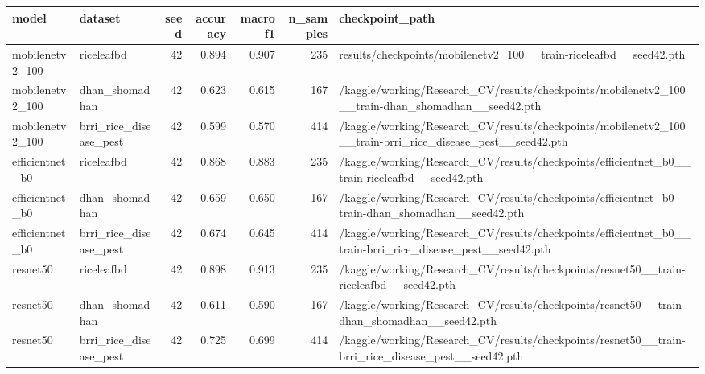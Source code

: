 \begin{tabular}{llrrrrl}
\toprule
model & dataset & seed & accuracy & macro_f1 & n_samples & checkpoint_path \\
\midrule
mobilenetv2_100 & riceleafbd & 42 & 0.894 & 0.907 & 235 & results/checkpoints/mobilenetv2_100__train-riceleafbd__seed42.pth \\
mobilenetv2_100 & dhan_shomadhan & 42 & 0.623 & 0.615 & 167 & /kaggle/working/Research_CV/results/checkpoints/mobilenetv2_100__train-dhan_shomadhan__seed42.pth \\
mobilenetv2_100 & brri_rice_disease_pest & 42 & 0.599 & 0.570 & 414 & /kaggle/working/Research_CV/results/checkpoints/mobilenetv2_100__train-brri_rice_disease_pest__seed42.pth \\
efficientnet_b0 & riceleafbd & 42 & 0.868 & 0.883 & 235 & /kaggle/working/Research_CV/results/checkpoints/efficientnet_b0__train-riceleafbd__seed42.pth \\
efficientnet_b0 & dhan_shomadhan & 42 & 0.659 & 0.650 & 167 & /kaggle/working/Research_CV/results/checkpoints/efficientnet_b0__train-dhan_shomadhan__seed42.pth \\
efficientnet_b0 & brri_rice_disease_pest & 42 & 0.674 & 0.645 & 414 & /kaggle/working/Research_CV/results/checkpoints/efficientnet_b0__train-brri_rice_disease_pest__seed42.pth \\
resnet50 & riceleafbd & 42 & 0.898 & 0.913 & 235 & /kaggle/working/Research_CV/results/checkpoints/resnet50__train-riceleafbd__seed42.pth \\
resnet50 & dhan_shomadhan & 42 & 0.611 & 0.590 & 167 & /kaggle/working/Research_CV/results/checkpoints/resnet50__train-dhan_shomadhan__seed42.pth \\
resnet50 & brri_rice_disease_pest & 42 & 0.725 & 0.699 & 414 & /kaggle/working/Research_CV/results/checkpoints/resnet50__train-brri_rice_disease_pest__seed42.pth \\
\bottomrule
\end{tabular}
